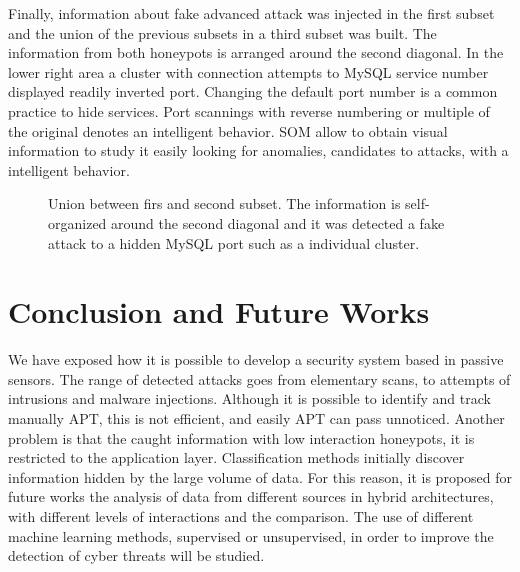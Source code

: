 \documentclass[a4paper]{llncs}
\begin{document}
Finally, information about fake advanced attack was injected in the first subset and the union of the previous subsets in a third subset was built. The information from both honeypots is arranged around the second diagonal. In the lower right area a cluster with connection attempts to MySQL service number displayed readily inverted port. Changing the default port number is a common practice to hide services. Port scannings with reverse numbering or multiple of the original denotes an intelligent behavior. SOM allow to obtain visual information to study it easily looking for  anomalies, candidates to attacks, with a intelligent behavior.

\begin{figure}[h]
	\label{fig:internalTypes}
	\caption{Union between firs and second subset. The information is self-organized around the second diagonal and it was detected a fake attack to a hidden MySQL port such as a individual cluster.}
\end{figure}

\section{Conclusion and Future Works}
\label{sec:conclusion&future}
We have exposed how it is possible to develop a security system based in passive sensors. The range of detected attacks goes from elementary scans, to attempts of intrusions and malware injections. Although it is possible to identify and track manually APT, this is not efficient, and easily APT can pass unnoticed. Another problem is that the caught information with low interaction honeypots, it is restricted to the application layer. Classification methods initially discover information hidden by the large volume of data. 
For this reason, it is proposed for future works the analysis of data from different sources in hybrid architectures, with different levels of interactions and the comparison. The use of different machine learning methods, supervised or unsupervised, in order to improve the detection of cyber threats will be studied.



\end{document}
